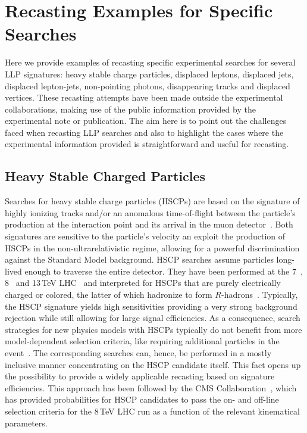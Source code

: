 \section{Recasting Examples for Specific Searches}
\label{sec:ch5-recastExamples}

Here we provide examples of recasting specific experimental
searches for several LLP signatures: heavy stable charge particles, displaced
leptons, displaced jets, displaced lepton-jets, non-pointing photons, disappearing tracks and displaced vertices.
These recasting attempts have been made outside the experimental collaborations,
making use of the public information provided by the experimental note or
publication. The aim here is to point out the challenges faced when recasting
LLP searches and also to highlight the cases where the
experimental information provided is straightforward and useful for
recasting.

\subsection{Heavy Stable Charged Particles}
\label{sec:ch5-HSCPs}

\renewcommand{\vec}[1]{\boldsymbol{#1}}
%

Searches for heavy stable charge particles (HSCPs) are based on the signature
of highly ionizing tracks
and/or an anomalous time-of-flight between the particle's production at the interaction point and its arrival in the
muon detector~\cite{Fairbairn:2006gg}.
Both signatures are sensitive to the particle's velocity an exploit the
production of HSCPs in the non-ultrarelativistic regime,
allowing for a powerful discrimination against the Standard Model background.
HSCP searches assume particles long-lived enough to traverse
the entire detector.
They have been performed at the 7~\cite{Chatrchyan:2012sp,Aad:2012pra},
8~\cite{Chatrchyan:2013oca,ATLAS:2014fka} and 13\,TeV
LHC~\cite{Aaboud:2016dgf,CMS:2016ybj} and interpreted for HSCPs that are
purely electrically charged or colored, the latter of which hadronize to form
$R$-hadrons~\cite{Farrar:1978xj}.
Typically, the HSCP signature yields high sensitivities providing 
a very strong background rejection while still allowing for large 
signal efficiencies. 
As a consequence, search strategies for new physics models with HSCPs
typically do not benefit from more model-dependent selection criteria, like requiring additional 
particles in the event~\cite{Heisig:2012zq}. The corresponding searches can, hence, be
performed in a mostly inclusive manner concentrating on the HSCP candidate itself.
This fact opens up the possibility to provide a widely applicable recasting based on signature
efficiencies. This approach has been followed by the CMS
Collaboration~\cite{Khachatryan:2015lla},
which has provided probabilities for HSCP candidates to pass the on- and
off-line selection criteria for the 8\,TeV LHC run as a function of the relevant kinematical parameters.



